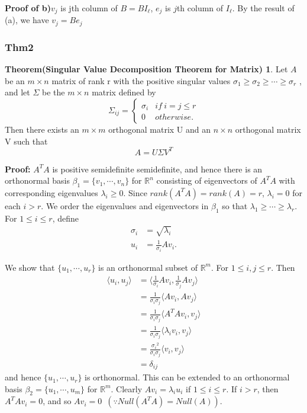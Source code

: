 \documentclass[12pt]{article}
\theoremstyle{definition}
\newtheorem*{thm2}{Theorem(Singular Value Decomposition Theorem for Matrix)}
\begin{document}
\textbf{Proof of b)}\quad $v_j$ is jth column of $B=BI_\ell$, 
$e_j$ is $j$th column of $I_\ell$. By the result of (a), we have $v_j=Be_j$

\subsubsection{Thm2}
\begin{thm2}
Let $A$ be an $m\times n$ matrix of rank r with the positive singular values $\sigma_1\geq \sigma_2\geq \cdots \geq \sigma_r$
, and let $\Sigma$ be the $m \times n$ matrix defined by
\[\Sigma_{ij}=\begin{cases}
    \sigma_i & if\ i=j\leq r\\
    0 & otherwise.
\end{cases}\]
Then there exists an $m\times m$ orthogonal matrix U and an $n\times n$ orthogonal matrix V such that
\[A=U\Sigma V^T\]
\end{thm2}

\textbf{Proof:}\quad
$A^TA$ is positive semidefinite semidefinite, and hence there is an
orthonormal basis $\beta_1=\{v_1,\cdots,v_n\}$ for $\mathbb{R}^n$ consisting of eigenvectors of $A^TA$ with corresponding eigenvalues $\lambda_i \geq 0$. Since $rank(A^TA)=rank(A)=r$, $\lambda_i=0$ for each $i>r$. We order the eigenvalues and eigenvectors in $\beta_1$ so that $\lambda_1 \geq \cdots \geq \lambda_r$. For $1\leq i\leq r$, define
\begin{align*}
    \sigma_i&=\sqrt{\lambda_i}\\
    u_i&=\frac{1}{\sigma_i}Av_i.
\end{align*}

We show that $\{u_1,\cdots,u_r\}$ is an orthonormal subset of $\mathbb{R}^m$. For $1\leq i,j\leq r$. Then
\begin{align*}
\langle u_i,u_j\rangle&=\langle\frac{1}{\sigma_i}Av_i,\frac{1}{\sigma_j}Av_j\rangle\\
&=\frac{1}{\sigma_i\sigma_j}\langle Av_i,Av_j\rangle\\
&=\frac{1}{\sigma_i\sigma_j}\langle A^TAv_i,v_j\rangle\\
&=\frac{1}{\sigma_i\sigma_j}\langle \lambda_iv_i,v_j\rangle\\
&=\frac{{\sigma_i}^2}{\sigma_i\sigma_j}\langle v_i,v_j\rangle\\
&=\delta_{ij}
\end{align*}
and hence $\{u_1,\cdots,u_r\}$ is orthonormal. This can be extended to an orthonormal basis $\beta_2=\{u_1,\cdots,u_m\}$ for $\mathbb{R}^m$. Clearly $Av_i=\lambda_iu_i$ if $1\leq i\leq r$. If $i>r$, then $A^TAv_i=0$, and so $Av_i=0$\ $(\because Null(A^TA)=Null(A))$.
\end{document}
